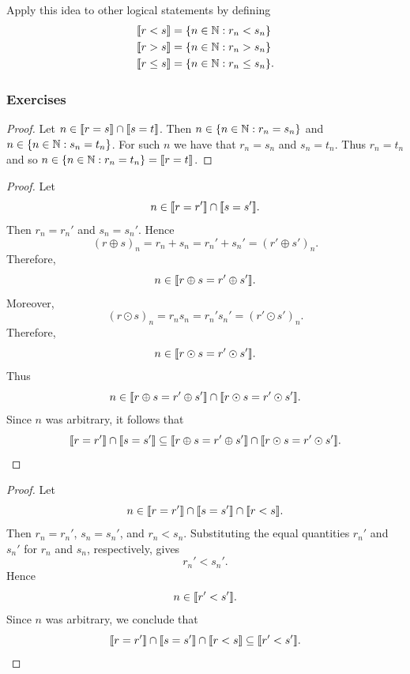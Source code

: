 Apply this idea to other logical statements by defining
\begin{align*}
    \llbracket r < s \rrbracket & = \{ n \in \mathbb{N} : r_n < s_n \} \\
    \llbracket r > s \rrbracket & = \{ n \in \mathbb{N} : r_n > s_n \} \\
    \llbracket r \leq s \rrbracket & = \{ n \in \mathbb{N} : r_n \leq s_n \}.
\end{align*}

\subsubsection{Exercises}

 \label{prop:transitive property of agreement sets}
\begin{proof}
    Let $n \in \llbracket r=s\rrbracket \cap \llbracket s=t\rrbracket$. Then $n \in \{ n \in \mathbb{N} : r_n = s_n \}$ and $n \in \{ n \in \mathbb{N} : s_n = t_n \}$. For such $n$ we have that $r_n=s_n$ and $s_n = t_n$. Thus $r_n=t_n$ and so $n \in \{ n \in \mathbb{N} : r_n = t_n \} = \llbracket r=t \rrbracket$. 
\end{proof}

 \label{prop:ring congruence}
\begin{proof}
    Let
    \[
    n \in \llbracket r=r'\rrbracket \cap \llbracket s=s'\rrbracket.
    \]
    Then \(r_n=r_n'\) and \(s_n=s_n'\). Hence
    \[
    (r\oplus s)_n
    =
    r_n+s_n
    =
    r_n'+s_n'
    =
    (r'\oplus s')_n.
    \]
    Therefore,
    \[
    n \in \llbracket r\oplus s=r'\oplus s'\rrbracket.
    \]
    Moreover,
    \[
    (r\odot s)_n
    =
    r_ns_n
    =
    r_n's_n'
    =
    (r'\odot s')_n.
    \]
    Therefore,
    \[
    n \in \llbracket r\odot s=r'\odot s'\rrbracket.
    \]
    Thus
    \[
    n \in
    \llbracket r\oplus s=r'\oplus s'\rrbracket
    \cap
    \llbracket r\odot s=r'\odot s'\rrbracket.
    \]
    Since \(n\) was arbitrary, it follows that
    \[
    \llbracket r=r'\rrbracket \cap \llbracket s=s'\rrbracket
    \subseteq
    \llbracket r\oplus s=r'\oplus s'\rrbracket
    \cap
    \llbracket r\odot s=r'\odot s'\rrbracket.
    \]
\end{proof}


\prop{
\[
\ldb r=r'\rdb
\cap
\ldb s=s'\rdb
\cap
\ldb r<s\rdb
\subseteq
\ldb r'<s'\rdb.
\]
}
\begin{proof}
    Let
    \[
    n \in
    \llbracket r=r'\rrbracket
    \cap
    \llbracket s=s'\rrbracket
    \cap
    \llbracket r<s\rrbracket.
    \]
    Then \(r_n=r_n'\), \(s_n=s_n'\), and \(r_n<s_n\). Substituting the
    equal quantities \(r_n'\) and \(s_n'\) for \(r_n\) and \(s_n\),
    respectively, gives
    \[
    r_n' < s_n'.
    \]
    Hence
    \[
    n \in \llbracket r'<s'\rrbracket.
    \]
    Since \(n\) was arbitrary, we conclude that
    \[
    \ldb r=r'\rdb
    \cap
    \ldb s=s'\rdb
    \cap
    \ldb r<s\rdb
    \subseteq
    \ldb r'<s'\rdb.
    \]
\end{proof}


